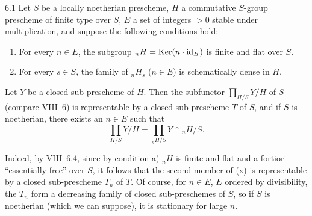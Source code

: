 \par{}
\par
{}
\begin{proposition}{6.1}\label{XI.6.1}
Let $S$ be a locally noetherian prescheme, $H$ a commutative $S$-group prescheme of finite type over $S$, $E$ a set of integers $>0$ stable under multiplication, and suppose the following conditions hold:
\begin{enumerate}[label=\alph*)]
\item For every $n\in E$, the subgroup ${}_nH=\operatorname{Ker}(n\cdot\mathrm{id}_H)$ is finite and flat over $S$.
\item For every $s\in S$, the family of ${}_nH_s$ ($n\in E$) is schematically dense in $H$.
\end{enumerate}
Let $Y$ be a closed sub-prescheme of $H$. Then the subfunctor $\prod_{H/S}Y/H$ of $S$ (compare VIII~6) is representable by a closed sub-prescheme $T$ of $S$, and if $S$ is noetherian, there exists an $n\in E$ such that
\begin{equation}\tag{x}
\prod_{H/S}Y/H=\prod_{{}_nH/S}Y\cap{}_nH/S.
\end{equation}
\end{proposition}
Indeed, by VIII~6.4, since by condition a) ${}_nH$ is finite and flat and a fortiori ``essentially free'' over $S$, it follows that the second member of (x) is representable by a closed sub-prescheme $T_n$ of $T$. Of course, for $n\in E$, $E$ ordered by divisibility, the $T_n$ form a decreasing family of closed sub-preschemes of $S$, so if $S$ is noetherian (which we can suppose), it is stationary for large $n$.

